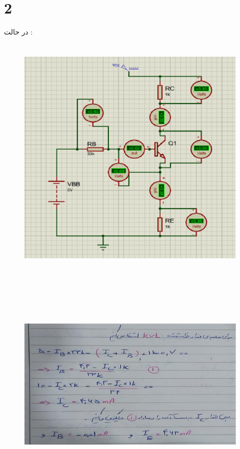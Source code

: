 \documentclass[12pt]{article}
\begin{document}
\clearpage
\section{2}
در حالت :
\begin{figure}[H]
	\begin{center}
		\includegraphics[width=\textwidth, height=12cm]{./images/9.3}
	\end{center}
\end{figure}

\begin{figure}[H]
	\begin{center}
		\includegraphics[width=\textwidth, height=11cm]{./images/9.3.1}
	\end{center}
\end{figure}
\end{document}
